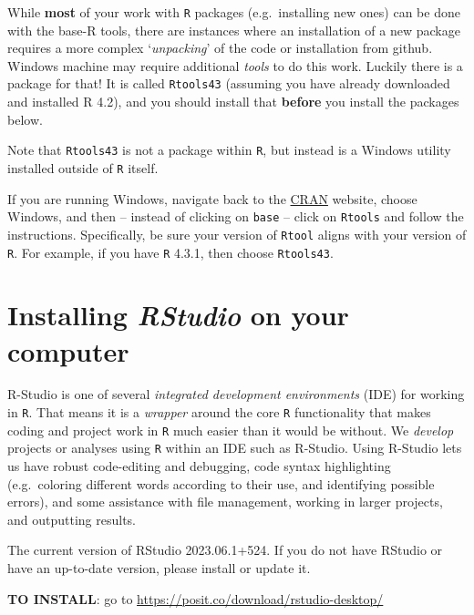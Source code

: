 \documentclass[
]{book}
\begin{document}
While \textbf{most} of your work with \texttt{R} packages (e.g.~installing new ones) can be done with the base-R tools, there are instances where an installation of a new package requires a more complex `\emph{unpacking}' of the code or installation from github. Windows machine may require additional \emph{tools} to do this work. Luckily there is a package for that! It is called \texttt{Rtools43} (assuming you have already downloaded and installed R 4.2), and you should install that \textbf{before} you install the packages below.

Note that \texttt{Rtools43} is not a package within \texttt{R}, but instead is a Windows utility installed outside of \texttt{R} itself.

If you are running Windows, navigate back to the \href{https://cran.r-project.org}{CRAN} website, choose Windows, and then -- instead of clicking on \texttt{base} -- click on \texttt{Rtools} and follow the instructions. Specifically, be sure your version of \texttt{Rtool} aligns with your version of \texttt{R}. For example, if you have \texttt{R} 4.3.1, then choose \texttt{Rtools43}.

\hypertarget{installing-rstudio-on-your-computer}{%
\section*{\texorpdfstring{Installing \emph{RStudio} on your computer}{Installing RStudio on your computer}}\label{installing-rstudio-on-your-computer}}

R-Studio is one of several \emph{integrated development environments} (IDE) for working in \texttt{R}. That means it is a \emph{wrapper} around the core \texttt{R} functionality that makes coding and project work in \texttt{R} much easier than it would be without. We \emph{develop} projects or analyses using \texttt{R} within an IDE such as R-Studio. Using R-Studio lets us have robust code-editing and debugging, code syntax highlighting (e.g.~coloring different words according to their use, and identifying possible errors), and some assistance with file management, working in larger projects, and outputting results.

The current version of RStudio 2023.06.1+524. If you do not have RStudio or have an up-to-date version, please install or update it.

\textbf{TO INSTALL}: go to \url{https://posit.co/download/rstudio-desktop/}
\end{document}
